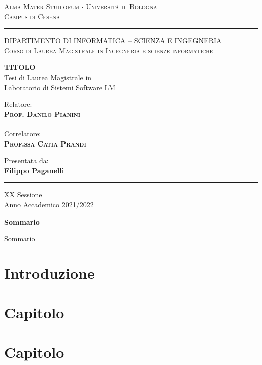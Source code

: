 \documentclass[12pt,a4paper]{report}
\begin{document}
  
\begin{titlepage}
\begin{center}
{{\Large{\textsc{Alma Mater Studiorum $\cdot$ Universit\`a di
Bologna\\\vspace{2mm}Campus di Cesena}}}} \rule[0.1cm]{15.8cm}{0.2mm}

{\small{\textsc { DIPARTIMENTO DI INFORMATICA – SCIENZA E INGEGNERIA \\
\vspace{3mm}
Corso di Laurea Magistrale in Ingegneria e scienze informatiche}}}
\end{center}
\vspace{15mm}
\begin{center}
{\LARGE\textbf{TITOLO}}\\
\vspace{20mm} {\large{\sc Tesi di Laurea Magistrale in\\ Laboratorio di Sistemi Software LM}}
\end{center}
\vfill
\par
\noindent

\begin{minipage}[t]{0.47\textwidth}
{\large{\sc Relatore:}\\
{\bf \textsc{Prof. Danilo Pianini}}}\\ \\
{\large{\sc Correlatore:}\\
{\bf \textsc{Prof.ssa Catia Prandi}}}\\
\vskip 8pt
\end{minipage}
\hfill
\begin{minipage}[t]{0.47\textwidth}\raggedleft
{\large{\sc Presentata da:}\\
{\bf Filippo Paganelli}}
\end{minipage}
\vspace{20mm}
\begin{center}
\rule[0.1cm]{15.8cm}{0.2mm}
{\large{\sc XX Sessione\\
Anno Accademico 2021/2022}}
\end{center}
\end{titlepage}

\newpage

\begin{center}
{\LARGE{\bf Sommario}}
\end{center}
{
\noindent
Sommario
}

\newpage

\tableofcontents

\chapter{Introduzione}
\label{ch:introduzione}


\chapter{Capitolo}
\label{ch:capitolo2}


\chapter{Capitolo}
\label{ch:capitolo3}

\end{document}
